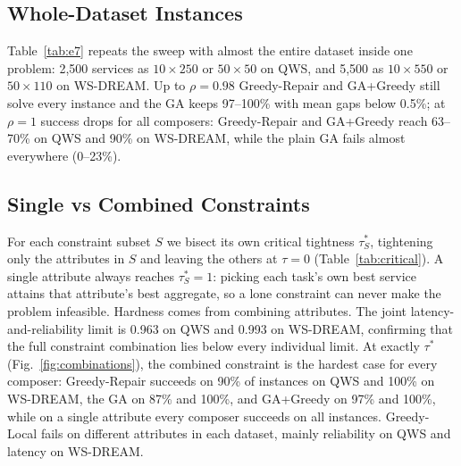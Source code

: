 \documentclass[conference]{IEEEtran}
\begin{document}
\begin{table}[t]
\centering
\caption{Scalability at $\rho=0.95$ (GL and Rnd Success; Gap and Runtime of the Main Composers). GL = Greedy-Local, Rnd = Random}\label{tab:scale}
\resizebox{\columnwidth}{!}{}
\end{table}

\subsection{Whole-Dataset Instances}
Table~\ref{tab:e7} repeats the sweep with almost the entire dataset inside one problem: 2,500 services as $10\times250$ or $50\times50$ on QWS, and 5,500 as $10\times550$ or $50\times110$ on WS-DREAM. Up to $\rho=0.98$ Greedy-Repair and GA+Greedy still solve every instance and the GA keeps 97--100\% with mean gaps below 0.5\%; at $\rho=1$ success drops for all composers: Greedy-Repair and GA+Greedy reach 63--70\% on QWS and 90\% on WS-DREAM, while the plain GA fails almost everywhere (0--23\%).

\begin{table}[t]
\centering
\caption{Success Rate on Whole-Dataset Instances (E7). G-Repair = Greedy-Repair, G+G = GA+Greedy}\label{tab:e7}
\resizebox{\columnwidth}{!}{}
\end{table}

\subsection{Single vs Combined Constraints}
For each constraint subset $S$ we bisect its own critical tightness $\tau^{*}_S$, tightening only the attributes in $S$ and leaving the others at $\tau=0$ (Table~\ref{tab:critical}). A single attribute always reaches $\tau^{*}_S=1$: picking each task's own best service attains that attribute's best aggregate, so a lone constraint can never make the problem infeasible. Hardness comes from combining attributes. The joint latency-and-reliability limit is 0.963 on QWS and 0.993 on WS-DREAM, confirming that the full constraint combination lies below every individual limit. At exactly $\tau^{*}$ (Fig.~\ref{fig:combinations}), the combined constraint is the hardest case for every composer: Greedy-Repair succeeds on 90\% of instances on QWS and 100\% on WS-DREAM, the GA on 87\% and 100\%, and GA+Greedy on 97\% and 100\%, while on a single attribute every composer succeeds on all instances. Greedy-Local fails on different attributes in each dataset, mainly reliability on QWS and latency on WS-DREAM.
\end{document}
